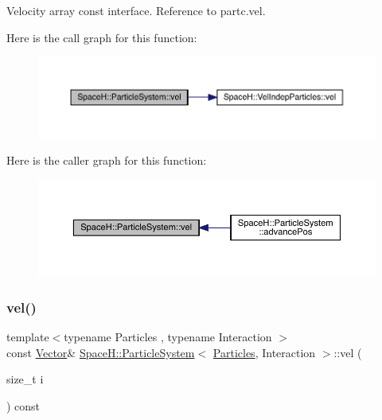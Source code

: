 Velocity array const interface. Reference to partc.\+vel. 

Here is the call graph for this function\+:
\nopagebreak
\begin{figure}[H]
\begin{center}
\leavevmode
\includegraphics[width=350pt]{class_space_h_1_1_particle_system_a51c2aae4b2dd9d5aca3c15eb9116ff2d_cgraph}
\end{center}
\end{figure}
Here is the caller graph for this function\+:
\nopagebreak
\begin{figure}[H]
\begin{center}
\leavevmode
\includegraphics[width=350pt]{class_space_h_1_1_particle_system_a51c2aae4b2dd9d5aca3c15eb9116ff2d_icgraph}
\end{center}
\end{figure}
\mbox{\label{class_space_h_1_1_particle_system_a5f781e70a7b479b5b8ad427241203dae}} 
\subsubsection{\texorpdfstring{vel()}{vel()}\hspace{0.1cm}{\footnotesize\ttfamily [2/2]}}
{\footnotesize\ttfamily template$<$typename Particles , typename Interaction $>$ \\
const \mbox{\hyperlink{class_space_h_1_1_particle_system_a7cb2705f7e4edf94131c31eda3edfded}{Vector}}\& \mbox{\hyperlink{class_space_h_1_1_particle_system}{Space\+H\+::\+Particle\+System}}$<$ \mbox{\hyperlink{struct_space_h_1_1_particles}{Particles}}, Interaction $>$\+::vel (\begin{DoxyParamCaption}\item[{size\+\_\+t}]{i }\end{DoxyParamCaption}) const\hspace{0.3cm}{\ttfamily [inline]}}



